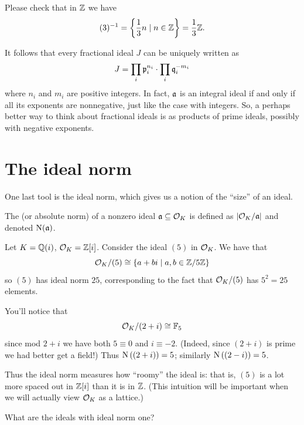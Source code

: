 \begin{example}[$(3)\inv$ in $\ZZ$]
	Please check that in $\ZZ$ we have
	\[ (3)^{-1} = \left\{ \frac 13 n \mid n \in \mathbb Z \right\} = \frac 13 \mathbb Z. \]
\end{example}

It follows that every fractional ideal $J$ can be uniquely written as
\[ J = \prod_i \mathfrak p_i^{n_i} \cdot \prod_i \mathfrak q_i^{-m_i} \]
where $n_i$ and $m_i$ are positive integers.
In fact, $\mathfrak a$ is an integral ideal if and only if all its exponents are nonnegative,
just like the case with integers.
So, a perhaps better way to think about fractional ideals is
as products of prime ideals, possibly with negative exponents.

\section{The ideal norm}
One last tool is the ideal norm,
which gives us a notion of the ``size'' of an ideal.
\begin{definition}
	The  (or absolute norm)
	of a nonzero ideal $\mathfrak a \subseteq \mathcal O_K$ is defined as
	$|\mathcal O_K / \mathfrak a|$ and denoted $\operatorname{N}(\mathfrak a)$.
\end{definition}
\begin{example}
	Let $K = \mathbb Q(i)$, $\mathcal O_K = \mathbb Z[i]$.
	Consider the ideal $(5)$ in $\mathcal O_K$.
	We have that
	\[ \mathcal O_K / (5) \cong \{ a+bi \mid a,b \in \mathbb Z/5\mathbb Z \} \]
	so $(5)$ has ideal norm $25$,
	corresponding to the fact that $\mathcal O_K/(5)$ has $5^2=25$ elements.
\end{example}

\begin{example}
	You'll notice that \[ \mathcal O_K / (2+i) \cong \mathbb F_5 \]
	since mod $2+i$ we have both $5 \equiv 0$ and $i \equiv -2$.
	(Indeed, since $(2+i)$ is prime we had better get a field!)
	Thus $\operatorname{N}\left( (2+i) \right) = 5$; similarly $\operatorname{N}\left( (2-i) \right) = 5$.
\end{example}

Thus the ideal norm measures how ``roomy'' the ideal is:
that is, $(5)$ is a lot more spaced out in $\mathbb Z[i]$ than it is in $\ZZ$.
(This intuition will be important when we will actually view $\mathcal O_K$ as a lattice.)

\begin{ques}
	What are the ideals with ideal norm one?
\end{ques}

